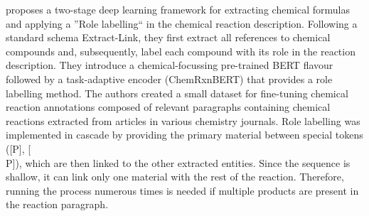 \cite{guo2021automated} proposes a two-stage deep learning framework for extracting chemical formulas and applying a ''Role labelling`` in the chemical reaction description. 
Following a standard schema Extract-Link, they first extract all references to chemical compounds and, subsequently, label each compound with its role in the reaction description. 
They introduce a chemical-focussing pre-trained BERT flavour followed by a task-adaptive encoder (ChemRxnBERT) that provides a role labelling method. 
The authors created a small dataset for fine-tuning chemical reaction annotations composed of relevant paragraphs containing chemical reactions extracted from articles in various chemistry journals. 
Role labelling was implemented in cascade by providing the primary material between special tokens ([P], [\\P]), which are then linked to the other extracted entities. Since the sequence is shallow, it can link only one material with the rest of the reaction. Therefore, running the process numerous times is needed if multiple products are present in the reaction paragraph.  






